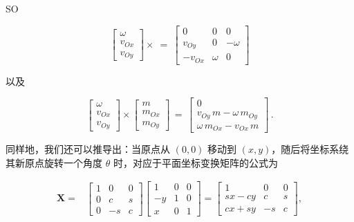 \documentclass[10pt,a4paper]{book}
\theoremstyle{thmstyle} %
\theoremstyle{defstyle} %
\theoremstyle{prostyle} %
\begin{document}
SO



$$
\left[ \begin{array}{l} { \omega } \\{ v _ { O x } } \\{ v _ { O y } } \end{array} \right] \times \ = \ \left[ \begin{array}{lll} { 0 } & { 0 } & { 0 } \\{ v _ { O y } } & { 0 } & { - \omega } \\{ - v _ { O x } } & { \omega } & { 0 } \end{array} \right]
$$



以及



$$
\left[ \begin{array}{l} { \omega } \\{ v _ { O x } } \\{ v _ { O y } } \end{array} \right] \times \left[ \begin{array}{l} { m } \\{ m _ { O x } } \\{ m _ { O y } } \end{array} \right] \, = \, \left[ \begin{array}{l} { 0 } \\{ v _ { O y } \, m - \omega \, m _ { O y } } \\{ \omega \, m _ { O x } - v _ { O x } \, m } \end{array} \right] \, .
$$



同样地，我们还可以推导出：当原点从 $(0,0)$ 移动到 $(x,y)$，随后将坐标系绕其新原点旋转一个角度 $\theta$ 时，对应于平面坐标变换矩阵的公式为



$$
\begin{array}{rl} { \boldsymbol{ X } = } & { { } \left[ \begin{array}{lll} { 1 } & { 0 } & { 0 } \\{ 0 } & { c } & { s } \\{ 0 } & { - s } & { c } \end{array} \right] \left[ \begin{array}{lll} { 1 } & { 0 } & { 0 } \\{ - y } & { 1 } & { 0 } \\{ x } & { 0 } & { 1 } \end{array} \right] = \left[ \begin{array}{lll} { 1 } & { 0 } & { 0 } \\{ s x - c y } & { c } & { s } \\{ c x + s y } & { - s } & { c } \end{array} \right] , } \end{array}
$$
\end{document}
